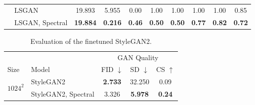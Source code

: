 \documentclass[letterpaper]{article} %
\begin{document}
\begin{table}
\begin{tabular}{l|l|ccc|ccccc}
 & LSGAN & 19.893 & 5.955 & 0.00 & 1.00 & 1.00 & 1.00 & 1.00 & 0.85\\
 & LSGAN, Spectral & {\bf 19.884} & {\bf 0.216} & {\bf 0.46}  &{\bf 0.50} &{\bf 0.50}  & {\bf 0.77}&{\bf 0.82}&{\bf 0.72}\\
\bottomrule


    \end{tabular}
\end{table}

\begin{table}
    \caption{Evaluation of the finetuned StyleGAN2.}
    \label{tab1-stylegan}
    \small
    \centering
    \begin{tabular}{l|l|ccc}
        \toprule
        &&\multicolumn{3}{c}{GAN Quality}\\
        Size & Model & FID $\downarrow$ & SD $\downarrow$ & CS $\uparrow$ \\
        \midrule
            \multicolumn{1}{c|}{\multirow{2}{*}{$1024^2$}} & StyleGAN2 & {\bf 2.733} & 32.250 & 0.09 \\
            & StyleGAN2, Spectral & 3.326 & {\bf 5.978} & {\bf 0.24} \\
        \bottomrule
    \end{tabular}
        
\end{table}
\end{document}
